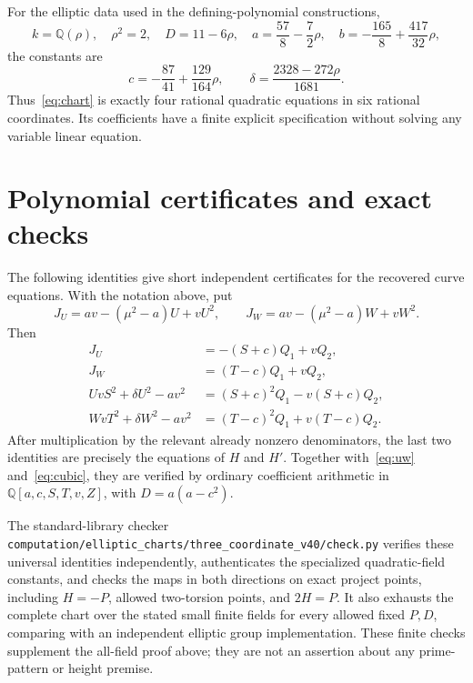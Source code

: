 \documentclass[11pt,a4paper]{article}
\newcommand{\Q}{\mathbb Q}
\begin{document}
For the elliptic data used in the defining-polynomial constructions,
\[
 k=\Q(\rho),\quad\rho^2=2,\quad D=11-6\rho,
 \quad a=\frac{57}{8}-\frac72\rho,
 \quad b=-\frac{165}{8}+\frac{417}{32}\rho,
\]
the constants are
\[
 c=-\frac{87}{41}+\frac{129}{164}\rho,
 \qquad \delta=\frac{2328-272\rho}{1681}.
\]
Thus~\eqref{eq:chart} is exactly four rational quadratic equations
in six rational coordinates. Its coefficients have a finite explicit
specification without solving any variable linear equation.

\section{Polynomial certificates and exact checks}
The following identities give short independent certificates for the
recovered curve equations. With the notation above, put
\[
 J_U=av-(\mu^2-a)U+vU^2,\qquad
 J_W=av-(\mu^2-a)W+vW^2.
\]
Then
\begin{align*}
 J_U&=-(S+c)Q_1+vQ_2,\\
 J_W&=(T-c)Q_1+vQ_2,\\
 UvS^2+\delta U^2-av^2&=(S+c)^2Q_1-v(S+c)Q_2,\\
 WvT^2+\delta W^2-av^2&=(T-c)^2Q_1+v(T-c)Q_2.
\end{align*}
After multiplication by the relevant already nonzero denominators,
the last two identities are precisely the equations of $H$ and $H'$.
Together with~\eqref{eq:uw} and~\eqref{eq:cubic}, they are verified
by ordinary coefficient arithmetic in $\Q[a,c,S,T,v,Z]$, with
$D=a(a-c^2)$.

The standard-library checker
\nolinkurl{computation/elliptic_charts/three_coordinate_v40/check.py}
verifies these universal identities independently, authenticates the
specialized quadratic-field constants, and checks the maps in both
directions on exact project points, including $H=-P$, allowed
two-torsion points, and $2H=P$. It also exhausts the complete chart
over the stated small finite fields for every allowed fixed $P,D$,
comparing with an independent elliptic group implementation. These
finite checks supplement the all-field proof above; they are not
an assertion about any prime-pattern or height premise.
\end{document}
